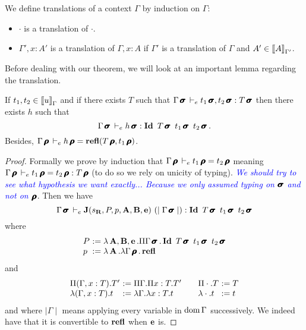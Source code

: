\documentclass[a4paper,english]{lipics-utf8x}
\newcommand\meta[1]{\noindent\textcolor{blue}{\emph{#1}}}
\begin{document}
  \begin{definition}
    We define translations of a context $\Gamma$ by induction on $\Gamma$:
    \begin{itemize}
      \item $\cdot$ is a translation of $\cdot$.
      \item $\Gamma', x:A'$ is a translation of $\Gamma, x:A$ if $\Gamma'$ is
            a translation of $\Gamma$ and $A' \in \mathopen{{[\kern-0.14em[}} A \mathclose{{]\kern-0.14em]}}_{\Gamma'}$.
    \end{itemize}
  \end{definition}

  Before dealing with our theorem, we will look at an important lemma regarding
  the translation.

  \begin{lemma}
    \label{lem:transleq}
    If $t_1, t_2 \in \mathopen{{[\kern-0.14em[}} u \mathclose{{]\kern-0.14em]}}_{\Gamma}$ and if
    there exists $T$ such that
    $\Gamma\operatorname{\pmb{\bm{\sigma}}} \,\vdash_e t_1\operatorname{\pmb{\bm{\sigma}}}, t_2\operatorname{\pmb{\bm{\sigma}}} : T\operatorname{\pmb{\bm{\sigma}}}$
    then there exists $h$ such that
    \[
      \Gamma\operatorname{\pmb{\bm{\sigma}}} \,\vdash_e h\operatorname{\pmb{\bm{\sigma}}} : \operatorname{\mathbf{Id}~} T\operatorname{\pmb{\bm{\sigma}}}\ t_1\operatorname{\pmb{\bm{\sigma}}}\ t_2\operatorname{\pmb{\bm{\sigma}}}.
    \]
    Besides, $\Gamma\operatorname{\pmb{\bm{\rho}}} \,\vdash_e h\operatorname{\pmb{\bm{\rho}}} = \operatorname{\mathbf{refl}}(T\operatorname{\pmb{\bm{\rho}}},t_1\operatorname{\pmb{\bm{\rho}}})$.
  \end{lemma}

  \begin{proof}
    Formally we prove by induction that
    $\Gamma\operatorname{\pmb{\bm{\rho}}} \,\vdash_e t_1\operatorname{\pmb{\bm{\rho}}} = t_2\operatorname{\pmb{\bm{\rho}}}$
    meaning $\Gamma\operatorname{\pmb{\bm{\rho}}} \,\vdash_e t_1\operatorname{\pmb{\bm{\rho}}} = t_2\operatorname{\pmb{\bm{\rho}}} : T\operatorname{\pmb{\bm{\rho}}}$
    (to do so we rely on unicity of typing).
    \meta{We should try to see what hypothesis we want exactly... Because we
    only assumed typing on $\operatorname{\pmb{\bm{\sigma}}}$ and not on $\operatorname{\pmb{\bm{\rho}}}$}.
    Then we have
    \[
      \Gamma\pfull \dere \J(\sR, P, p, \mA, \mB, \me)\ %
      (\mid \Gamma\pfull \mid) : \Id T\pfull\ t_1\pfull\ t_2\pfull
    \]
    where
    \[
      \begin{array}{l@{~}l}
        P &:= \lambda \mA,\mB,\me. \Pi \Gamma\pfull. %
              \Id T\pfull\ t_1\pfull\ t_2\pfull \\
        p &:= \lambda \mA. \lambda \Gamma\prfl. \refl
      \end{array}
    \]
    and
    \[
      \begin{array}{l@{~}l@{\qquad}l@{~}l}
        \Pi (\Gamma, x:T).T' &:= \Pi \Gamma. \Pi x:T. T' &
        \Pi \cdot. T &:= T \\
        \lambda (\Gamma, x:T).t &:= \lambda \Gamma. \lambda x:T.t &
        \lambda \cdot.t &:= t
      \end{array}
    \]
    and where $\mid \Gamma \mid$ means applying every variable in $\operatorname{dom} \Gamma$
    successively.
    We indeed have that it is convertible to $\operatorname{\mathbf{refl}}$ when $\operatorname{\mathbf{e}}$ is.
  \end{proof}
\end{document}
